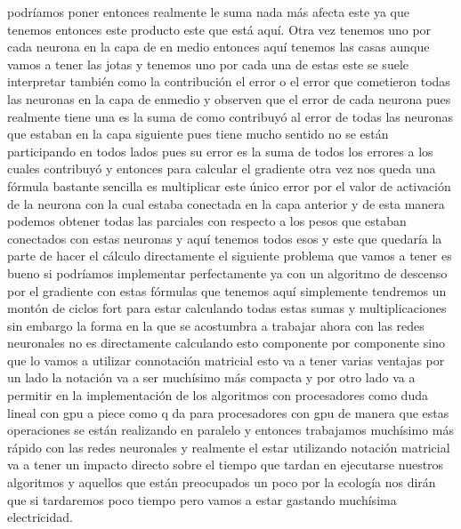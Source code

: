podríamos poner entonces realmente le suma nada más afecta este ya que tenemos entonces este producto este que está aquí.
Otra vez tenemos uno por cada neurona en la capa de en medio entonces aquí tenemos las casas aunque vamos a tener las jotas y tenemos uno por cada una de estas este se suele interpretar también como la contribución el error o el error que cometieron todas las neuronas en la capa de enmedio y observen que el error de cada neurona pues realmente tiene una es la suma de como contribuyó al error de todas las neuronas que estaban en la capa siguiente pues tiene mucho sentido no se están participando en todos lados pues su error es la suma de todos los errores a los cuales contribuyó y entonces para calcular el gradiente otra vez nos queda una fórmula bastante sencilla es multiplicar este único error por el valor de activación de la neurona con la cual estaba conectada en la capa anterior y de esta manera podemos obtener todas las parciales con respecto a los pesos que estaban conectados con estas neuronas y aquí tenemos todos esos y este que quedaría la parte de hacer el cálculo directamente el siguiente problema que vamos a tener es bueno si podríamos implementar perfectamente ya con un algoritmo de descenso por el gradiente con estas fórmulas que tenemos aquí simplemente tendremos un montón de ciclos fort para estar calculando todas estas sumas y multiplicaciones sin embargo la forma en la que se acostumbra a trabajar ahora con las redes neuronales no es directamente calculando esto componente por componente sino que lo vamos a utilizar connotación matricial esto va a tener varias ventajas por un lado la notación va a ser muchísimo más compacta y por otro lado va a permitir en la implementación de los algoritmos con procesadores como duda lineal con gpu a piece como q da para procesadores con gpu de manera que estas operaciones se están realizando en paralelo y entonces trabajamos muchísimo más rápido con las redes neuronales y realmente el estar utilizando notación matricial va a tener un impacto directo sobre el tiempo que tardan en ejecutarse nuestros algoritmos y aquellos que están preocupados un poco por la ecología nos dirán que si tardaremos poco tiempo pero vamos a estar gastando muchísima electricidad.
